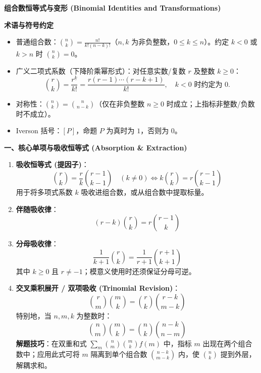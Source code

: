\textbf{组合数恒等式与变形 (Binomial Identities and Transformations)}

\textbf{术语与符号约定}
\begin{itemize}
    \item 普通组合数：$\binom{n}{k} = \frac{n!}{k!(n-k)!}$（$n,k$ 为非负整数，$0\le k\le n$）。约定 $k < 0$ 或 $k > n$ 时 $\binom{n}{k} = 0$。
    \item 广义二项式系数（下降阶乘幂形式）：对任意实数/复数 $r$ 及整数 $k \ge 0$：
    \[
    \binom{r}{k} = \frac{r^{\underline{k}}}{k!} = \frac{r(r-1)\cdots(r-k+1)}{k!}, \quad k < 0 \text{ 时约定为 } 0.
    \]
    \item 对称性：$\binom{n}{k} = \binom{n}{n-k}$（仅在非负整数 $n \ge 0$ 时成立；上指标非整数/负数时不成立）。
    \item Iverson 括号：$[P]$，命题 $P$ 为真时为 $1$，否则为 $0$。
\end{itemize}

\textbf{一、核心单项与吸收恒等式 (Absorption \& Extraction)}
\begin{enumerate}
    \item \textbf{吸收恒等式 (提因子)}：
    \[
    \binom{r}{k} = \frac{r}{k} \binom{r-1}{k-1} \quad (k \neq 0) \iff k \binom{r}{k} = r \binom{r-1}{k-1}
    \]
    用于将多项式系数 $k$ 吸收进组合数，或从组合数中提取标量。
    \item \textbf{伴随吸收律}：
    \[
    (r-k) \binom{r}{k} = r \binom{r-1}{k}
    \]
    \item \textbf{分母吸收律}：
    \[
    \frac{1}{k+1} \binom{r}{k} = \frac{1}{r+1} \binom{r+1}{k+1}
    \]
    其中 $k\ge0$ 且 $r\ne-1$；模意义使用时还须保证分母可逆。
    \item \textbf{交叉乘积展开 / 双项吸收 (Trinomial Revision)}：
    \[
    \binom{r}{m} \binom{m}{k} = \binom{r}{k} \binom{r-k}{m-k}
    \]
    特别地，当 $n, m, k$ 为整数时：
    \[
    \binom{n}{m} \binom{m}{k} = \binom{n}{k} \binom{n-k}{n-m}
    \]
    \textbf{解题技巧}：在双重和式 $\sum_m \binom{n}{m} \binom{m}{k} f(m)$ 中，指标 $m$ 出现在两个组合数中；应用此式可将 $m$ 隔离到单个组合数 $\binom{n-k}{m-k}$ 内，使 $\binom{n}{k}$ 提到外层，解耦求和。
\end{enumerate}

